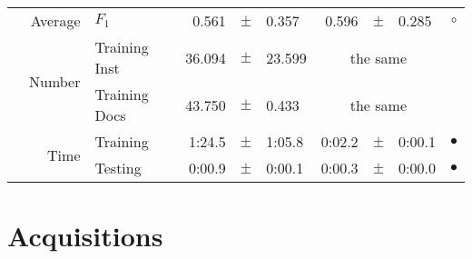 \begin{longtable}{|r|r|l||rcl|rcl|c|}
\cline{2-10} &                     Average &           $F_1$ &       0.561 &  $\pm$  &       0.357 &       0.596 &  $\pm$  &       0.285 & $\circ$ \\
\cline{2-10} & \multirow{2}{*}{    Number} &   Training Inst &      36.094 &  $\pm$  &      23.599 &    \multicolumn{3}{c|}{the same}         &  \\
\cline{3-10} &                             &   Training Docs &      43.750 &  $\pm$  &       0.433 &    \multicolumn{3}{c|}{the same}         &  \\
\cline{2-10} & \multirow{2}{*}{      Time} &        Training &      1:24.5 &  $\pm$  &      1:05.8 &      0:02.2 &  $\pm$  &      0:00.1 & $\bullet$ \\
\cline{3-10} &                             &         Testing &      0:00.9 &  $\pm$  &      0:00.1 &      0:00.3 &  $\pm$  &      0:00.0 & $\bullet$ \\
\hline
\end{longtable}

\clearpage

\section{Acquisitions} \label{sec:complete_eval_acq}


